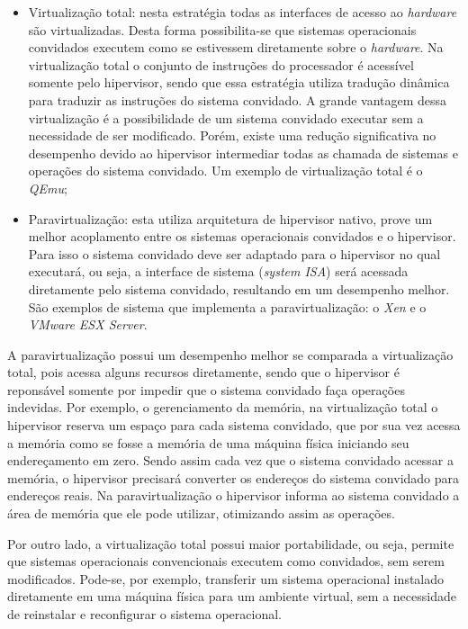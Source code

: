 \begin{itemize}
 \item Virtualização total: nesta estratégia todas as interfaces de acesso ao \textit{hardware} são virtualizadas. Desta forma
 possibilita-se que sistemas operacionais convidados executem como se estivessem diretamente sobre o \textit{hardware}. Na virtualização
 total o conjunto de instruções do processador é acessível somente pelo hipervisor, sendo que essa estratégia utiliza tradução dinâmica
 para traduzir as instruções do sistema convidado. A grande vantagem dessa virtualização é a possibilidade de um sistema convidado 
 executar sem a necessidade de ser modificado. Porém, existe uma redução significativa no desempenho devido ao hipervisor intermediar 
 todas as chamada de sistemas e operações do sistema convidado. Um exemplo de virtualização total é o \textit{QEmu};
 \item Paravirtualização: esta utiliza arquitetura de hipervisor nativo, prove um melhor acoplamento entre os sistemas operacionais 
 convidados e o hipervisor. Para isso o sistema convidado deve ser adaptado para o hipervisor no qual executará, ou seja, a interface de 
 sistema (\textit{system ISA}) será acessada diretamente pelo sistema convidado, resultando em um desempenho melhor. São exemplos de 
 sistema que implementa a paravirtualização: o \textit{Xen} e o \textit{VMware ESX Server}.
\end{itemize}

A paravirtualização possui um desempenho melhor se comparada a virtualização total, pois acessa alguns recursos diretamente, sendo que 
o hipervisor é reponsável somente por impedir que o sistema convidado faça operações indevidas. Por exemplo, o gerenciamento da memória, 
na virtualização total o hipervisor reserva um espaço para cada sistema convidado, que por sua vez acessa a memória como se fosse a memória 
de uma máquina física iniciando seu endereçamento em zero. Sendo assim cada vez que o sistema convidado acessar a memória, o hipervisor 
precisará converter os endereços do sistema convidado para endereços reais. Na paravirtualização o hipervisor informa ao sistema 
convidado a área de memória que ele pode utilizar, otimizando assim as operações.

Por outro lado, a virtualização total possui maior portabilidade, ou seja, permite que sistemas operacionais convencionais executem
como convidados, sem serem modificados. Pode-se, por exemplo, transferir um sistema operacional instalado diretamente em uma máquina física para um ambiente
virtual, sem a necessidade de reinstalar e reconfigurar o sistema operacional.

